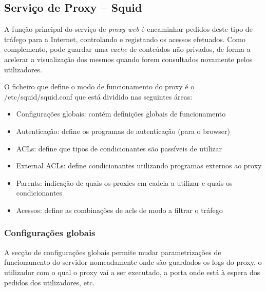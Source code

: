 \subsection{Serviço de Proxy -- Squid}

\begin{comment}
O serviço de proxy tem a função de encaminhar os pedidos para a
Internet e guardar uma \emph{cache} dos conteúdos de forma a acelerar a
visualização dos mesmos quando forem novamente consultados pelos
utilizadores.
\end{comment}

A função principal do serviço de \textit{proxy web} é encaminhar pedidos deste tipo de tráfego para a Internet, controlando e registando os acessos efetuados. Como complemento, pode guardar uma \textit{cache} de conteúdos não privados, de forma a acelerar a visualização dos mesmos quando forem consultados novamente pelos utilizadores.

O ficheiro que define o modo de funcionamento do proxy é o /etc/squid/squid.conf
que está dividido nas seguintes áreas:

\begin{itemize}
\item Configurações globais: contém definições globais de
funcionamento

\item Autenticação: define os programas de autenticação (para o browser)

\item ACLs: define que tipos de condicionantes são passíveis de utilizar

\item External ACLs: define condicionantes utilizando programas externos
ao proxy

\item Parents: indicação de quais os proxies em cadeia a utilizar e quais
os condicionantes

\item Acessos: define as combinações de acls de modo a filtrar o tráfego
\end{itemize}

\subsubsection{Configurações globais}

A secção de configurações globais permite mudar
parametrizações de funcionamento do servidor nomeadamente onde
são guardados os logs do proxy, o utilizador com o qual o proxy vai a
ser executado, a porta onde está à espera dos pedidos dos
utilizadores, etc.

